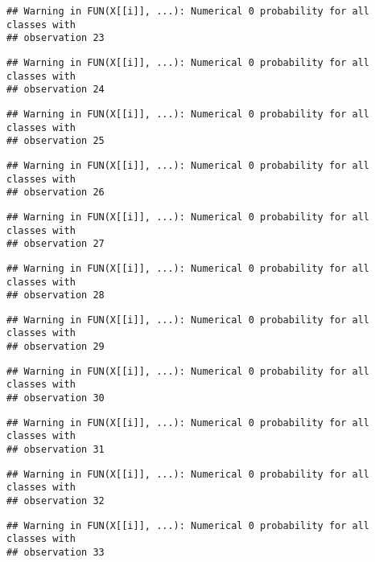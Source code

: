 \documentclass[
]{article}
\begin{document}
\begin{verbatim}
## Warning in FUN(X[[i]], ...): Numerical 0 probability for all classes with
## observation 23
\end{verbatim}

\begin{verbatim}
## Warning in FUN(X[[i]], ...): Numerical 0 probability for all classes with
## observation 24
\end{verbatim}

\begin{verbatim}
## Warning in FUN(X[[i]], ...): Numerical 0 probability for all classes with
## observation 25
\end{verbatim}

\begin{verbatim}
## Warning in FUN(X[[i]], ...): Numerical 0 probability for all classes with
## observation 26
\end{verbatim}

\begin{verbatim}
## Warning in FUN(X[[i]], ...): Numerical 0 probability for all classes with
## observation 27
\end{verbatim}

\begin{verbatim}
## Warning in FUN(X[[i]], ...): Numerical 0 probability for all classes with
## observation 28
\end{verbatim}

\begin{verbatim}
## Warning in FUN(X[[i]], ...): Numerical 0 probability for all classes with
## observation 29
\end{verbatim}

\begin{verbatim}
## Warning in FUN(X[[i]], ...): Numerical 0 probability for all classes with
## observation 30
\end{verbatim}

\begin{verbatim}
## Warning in FUN(X[[i]], ...): Numerical 0 probability for all classes with
## observation 31
\end{verbatim}

\begin{verbatim}
## Warning in FUN(X[[i]], ...): Numerical 0 probability for all classes with
## observation 32
\end{verbatim}

\begin{verbatim}
## Warning in FUN(X[[i]], ...): Numerical 0 probability for all classes with
## observation 33
\end{verbatim}
\end{document}
